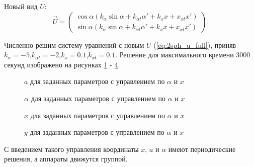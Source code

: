 Новый вид $U$:
\begin{equation}
\label{eq:2sph_u_full}
	\vec{U} = 
	\begin{pmatrix}
		\cos \alpha \left(k_\alpha \sin \alpha + k_{\alpha t}\alpha' + k_x x + x_{xt} x'\right)\\
		\sin \alpha \left(k_\alpha \sin \alpha + k_{\alpha t}\alpha' + k_x x + x_{xt} x'\right)
	\end{pmatrix}.
\end{equation}

Численно решим систему уравнений с новым $U$ (\ref{eq:2sph_u_full}), приняв $k_\alpha = -5$,$k_{\alpha t} = -2$,$k_x = 0.1$,$k_{x t} = 0.1$.
Решение для максимального времени $3000$ секунд изображено на рисунках \ref{ris:2sph_a_full_u} - \ref{ris:2sph_y_full_u}.

\begin{figure}[H]
	\caption{$a$ для заданных параметров с управлением по $\alpha$ и $x$}
	\label{ris:2sph_a_full_u}
\end{figure}
\begin{figure}[H]
	\caption{$\alpha$ для заданных параметров с управлением по $\alpha$ и $x$}
	\label{ris:2sph_alpha_full_u}
\end{figure} 
\begin{figure}[H]
	\caption{$x$ для заданных параметров с управлением по $\alpha$ и $x$}
	\label{ris:2sph_x_full_u}
\end{figure} 
\begin{figure}[H]
	\caption{$y$ для заданных параметров с управлением по $\alpha$ и $x$}
	\label{ris:2sph_y_full_u}
\end{figure} 

С введением такого управления координаты $x$, $a$ и $\alpha$ имеют периодические решения, а аппараты движутся группой.